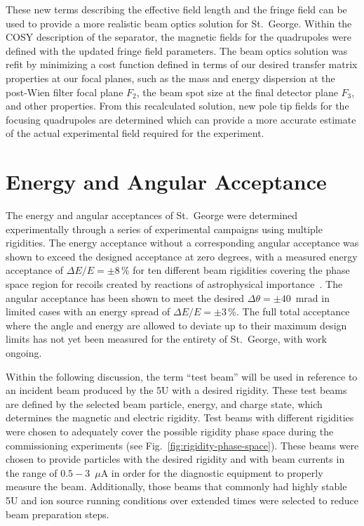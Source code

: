 These new terms describing the effective field length and the fringe
field can be used to provide a more realistic beam optics solution for
St.\ George. Within the COSY description of the separator, the magnetic
fields for the quadrupoles were defined with the updated fringe field
parameters. The beam optics solution was refit by minimizing a cost
function defined in terms of our desired transfer matrix properties at
our focal planes, such as the mass and energy dispersion at the
post-Wien filter focal plane $F_2$, the beam spot size at the final
detector plane $F_3$, and other properties. From this recalculated
solution, new pole tip fields for the focusing quadrupoles are
determined which can provide a more accurate estimate of the actual
experimental field required for the experiment.


\section{Energy and Angular Acceptance}
\label{sec:commissioning}

The energy and angular acceptances of St.\ George were determined
experimentally through a series of experimental campaigns using multiple
rigidities. The energy acceptance without a corresponding angular
acceptance was shown to exceed the designed acceptance at zero degrees,
with a measured energy acceptance of $\Delta E/E = \pm 8$\,\% for ten
different beam rigidities covering the phase space region for recoils
created by reactions of astrophysical importance~\cite{Meisel2017}. The
angular acceptance has been shown to meet the desired
$\Delta\theta = \pm 40$~mrad in limited cases with an energy spread of
$\Delta E/E = \pm 3$\,\%. The full total acceptance where the angle and
energy are allowed to deviate up to their maximum design limits has not
yet been measured for the entirety of St.\ George, with work ongoing.

Within the following discussion, the term ``test beam'' will be used in
reference to an incident beam produced by the 5U with a desired
rigidity. These test beams are defined by the selected beam particle,
energy, and charge state, which determines the magnetic and electric
rigidity. Test beams with different rigidities were chosen to adequately
cover the possible rigidity phase space during the commissioning
experiments (see Fig.~\ref{fig:rigidity-phase-space}). These beams were
chosen to provide particles with the desired rigidity and with beam
currents in the range of $0.5 - 3$~$\mu$A in order for the diagnostic
equipment to properly measure the beam. Additionally, those beams that
commonly had highly stable 5U and ion source running conditions over
extended times were selected to reduce beam preparation steps.

